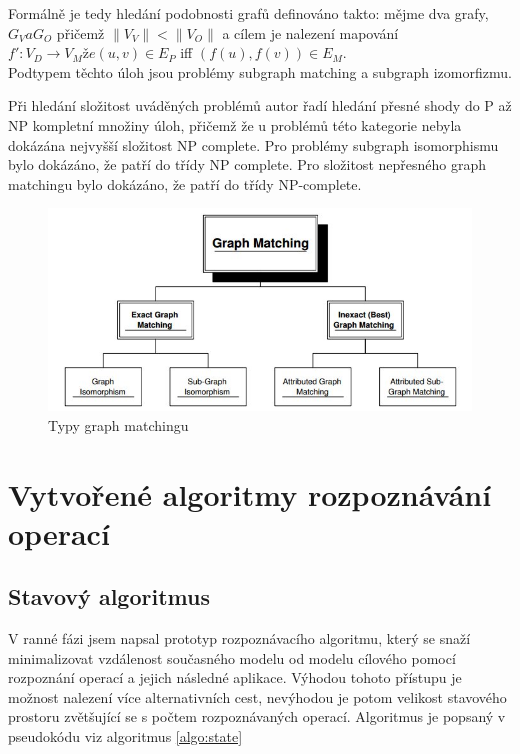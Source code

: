 \documentclass[11pt,twoside,a4paper]{book}
\begin{document}
 Formálně je tedy hledání podobnosti grafů definováno takto: mějme dva grafy,
 $G_V a G_O$ přičemž $\| V_V \| < \| V_O\|$ a cílem je nalezení mapování $f' :
 V_D \rightarrow V_M že (u, v) \in E_P$ iff $(f(u), f(v)) \in E_M$.\\
 
 Podtypem těchto úloh jsou problémy subgraph matching a subgraph izomorfizmu.
 
 Při hledání složitost uváděných problémů autor \cite{bengoetxeaPHD02} řadí
 hledání přesné shody do P až NP kompletní množiny úloh, přičemž že u problémů
 této kategorie nebyla dokázána nejvyšší složitost NP complete. Pro problémy
 subgraph isomorphismu bylo dokázáno, že patří do třídy NP complete. Pro
 složitost nepřesného graph matchingu bylo dokázáno, že patří do třídy NP-complete.
  
 \begin{figure}[H]
\begin{center}
\includegraphics[width=15cm]{figures/graph_matching.jpg}
\caption{Typy graph matchingu}
\label{fig:graph_matching}
\end{center}
\end{figure}
 
\FloatBarrier
 
 \chapter{Vytvořené algoritmy rozpoznávání operací}

\section{Stavový algoritmus}\label{sec:algo_state}

V ranné fázi jsem napsal prototyp rozpoznávacího algoritmu, který se snaží 
minimalizovat vzdálenost současného modelu od modelu cílového pomocí rozpoznání
operací a jejich následné aplikace. Výhodou tohoto přístupu je možnost nalezení
více alternativních cest, nevýhodou je potom velikost stavového prostoru
zvětšující se s počtem rozpoznávaných operací. Algoritmus je popsaný v
pseudokódu viz algoritmus \ref{algo:state}
\end{document}
